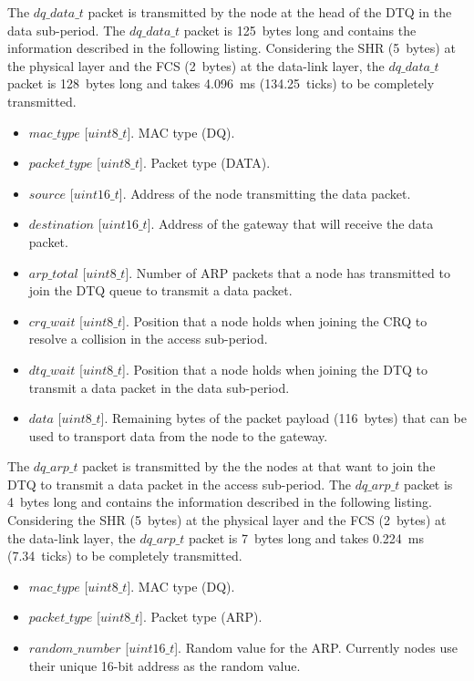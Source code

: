 The $dq\_data\_t$ packet is transmitted by the node at the head of the DTQ in the data sub-period. The $dq\_data\_t$ packet is 125~bytes long and contains the information described in the following listing. Considering the SHR (5~bytes) at the physical layer and the FCS (2~bytes) at the data-link layer, the $dq\_data\_t$ packet is 128~bytes long and takes 4.096~ms (134.25~ticks) to be completely transmitted.
\begin{itemize}
\item $mac\_type$ [$uint8\_t$]. MAC type (DQ).
\item $packet\_type$ [$uint8\_t$]. Packet type (DATA).
\item $source$ [$uint16\_t$]. Address of the node transmitting the data packet.
\item $destination$ [$uint16\_t$]. Address of the gateway that will receive the data packet.
\item $arp\_total$ [$uint8\_t$]. Number of ARP packets that a node has transmitted to join the DTQ queue to transmit a data packet.
\item $crq\_wait$ [$uint8\_t$]. Position that a node holds when joining the CRQ to resolve a collision in the access sub-period.
\item $dtq\_wait$ [$uint8\_t$]. Position that a node holds when joining the DTQ to transmit a data packet in the data sub-period.
\item $data$ [$uint8\_t$]. Remaining bytes of the packet payload (116~bytes) that can be used to transport data from the node to the gateway.
\end{itemize}

The $dq\_arp\_t$ packet is transmitted by the the nodes at that want to join the DTQ to transmit a data packet in the access sub-period. The $dq\_arp\_t$ packet is 4~bytes long and contains the information described in the following listing. Considering the SHR (5~bytes) at the physical layer and the FCS (2~bytes) at the data-link layer, the $dq\_arp\_t$ packet is 7~bytes long and takes 0.224~ms (7.34~ticks) to be completely transmitted.
\begin{itemize}
\item $mac\_type$ [$uint8\_t$]. MAC type (DQ).
\item $packet\_type$ [$uint8\_t$]. Packet type (ARP).
\item $random\_number$ [$uint16\_t$]. Random value for the ARP. Currently nodes use their unique 16-bit address as the random value.
\end{itemize}

